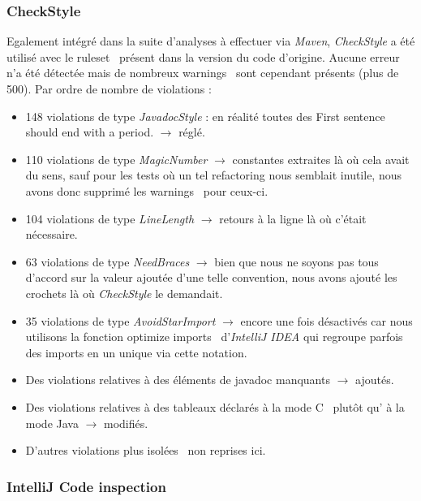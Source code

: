 \documentclass[12pt, openany]{report}
\begin{document}
\subsubsection*{CheckStyle}
Egalement intégré dans la suite d'analyses à effectuer via \textit{Maven}, \textit{CheckStyle} a été utilisé avec le \og ruleset \fg \, présent dans la version du code d'origine.
Aucune erreur n'a été détectée mais de nombreux \og warnings \fg \, sont cependant présents (plus de 500). Par ordre de nombre de \og violations \fg :
\begin{itemize}
	\item 148 violations de type \textit{JavadocStyle} : en réalité toutes des \og First sentence should end with a period. \fg $\rightarrow$ réglé. 
	\item 110 violations de type \textit{MagicNumber} $\rightarrow$ constantes extraites là où cela avait du sens, sauf pour les tests où un tel refactoring nous semblait inutile, nous avons donc supprimé les \og warnings \fg \, pour ceux-ci.
	\item 104 violations de type \textit{LineLength} $\rightarrow$ retours à la ligne là où c'était nécessaire.
	\item 63 violations de type \textit{NeedBraces} $\rightarrow$ bien que nous ne soyons pas tous d'accord sur la valeur ajoutée d'une telle convention, nous avons ajouté les crochets là où \textit{CheckStyle} le demandait.
	\item 35 violations de type \textit{AvoidStarImport} $\rightarrow$ encore une fois désactivés car nous utilisons la fonction \og optimize imports \fg \, d'\textit{IntelliJ IDEA} qui regroupe parfois des imports en un unique via cette notation.
	\item Des violations relatives à des éléments de javadoc manquants $\rightarrow$ ajoutés.
	\item Des violations relatives à des tableaux déclarés à la \og mode C \fg \, plutôt qu' à la \og mode Java \fg $\rightarrow$ modifiés.
	\item D'autres violations plus \og isolées \fg \, non reprises ici.
\end{itemize}

\subsubsection*{IntelliJ Code inspection}
\end{document}
